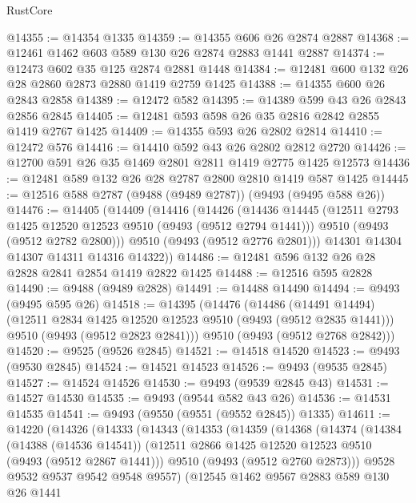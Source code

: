 \begin{lexlean}{RustCore}
\begin{coremodule}
@14355 := @14354 @1335
@14359 := @14355 @606 @26 @2874 @2887
@14368 := @12461 @1462 @603 @589 @130 @26 @2874 @2883 @1441 @2887
@14374 := @12473 @602 @35 @125 @2874 @2881 @1448
@14384 := @12481 @600 @132 @26 @28 @2860 @2873 @2880 @1419 @2759 @1425
@14388 := @14355 @600 @26 @2843 @2858
@14389 := @12472 @582
@14395 := @14389 @599 @43 @26 @2843 @2856 @2845
@14405 := @12481 @593 @598 @26 @35 @2816 @2842 @2855 @1419 @2767 @1425
@14409 := @14355 @593 @26 @2802 @2814
@14410 := @12472 @576
@14416 := @14410 @592 @43 @26 @2802 @2812 @2720
@14426 := @12700 @591 @26 @35 @1469 @2801 @2811 @1419 @2775 @1425 @12573
@14436 := @12481 @589 @132 @26 @28 @2787 @2800 @2810 @1419 @587 @1425
@14445 := @12516 @588 @2787 (@9488 (@9489 @2787)) (@9493 (@9495 @588 @26))
@14476 := @14405
    (@14409
      (@14416
        (@14426
          (@14436
            @14445
            (@12511 @2793 @1425 @12520 @12523 @9510 (@9493 (@9512 @2794 @1441)))
            @9510
            (@9493 (@9512 @2782 @2800)))
          @9510
          (@9493 (@9512 @2776 @2801)))
        @14301
        @14304
        @14307
        @14311
        @14316
        @14322))
@14486 := @12481 @596 @132 @26 @28 @2828 @2841 @2854 @1419 @2822 @1425
@14488 := @12516 @595 @2828
@14490 := @9488 (@9489 @2828)
@14491 := @14488 @14490
@14494 := @9493 (@9495 @595 @26)
@14518 := @14395
    (@14476
      (@14486
        (@14491 @14494)
        (@12511 @2834 @1425 @12520 @12523 @9510 (@9493 (@9512 @2835 @1441)))
        @9510
        (@9493 (@9512 @2823 @2841)))
      @9510
      (@9493 (@9512 @2768 @2842)))
@14520 := @9525 (@9526 @2845)
@14521 := @14518 @14520
@14523 := @9493 (@9530 @2845)
@14524 := @14521 @14523
@14526 := @9493 (@9535 @2845)
@14527 := @14524 @14526
@14530 := @9493 (@9539 @2845 @43)
@14531 := @14527 @14530
@14535 := @9493 (@9544 @582 @43 @26)
@14536 := @14531 @14535
@14541 := @9493 (@9550 (@9551 (@9552 @2845)) @1335)
@14611 := @14220
    (@14326
      (@14333
        (@14343
          (@14353
            (@14359
              (@14368
                (@14374
                  (@14384
                    (@14388 (@14536 @14541))
                    (@12511 @2866 @1425 @12520 @12523 @9510 (@9493 (@9512 @2867 @1441)))
                    @9510
                    (@9493 (@9512 @2760 @2873)))
                  @9528
                  @9532
                  @9537
                  @9542
                  @9548
                  @9557)
                (@12545
                  @1462
                  @9567
                  @2883
                  @589
                  @130
                  @26
                  @1441

\end{coremodule}
\end{lexlean}
